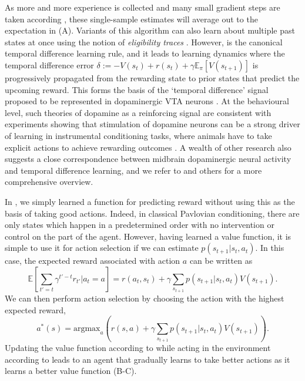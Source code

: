 As more and more experience is collected and many small gradient steps are taken according , these single-sample estimates will average out to the expectation in  (A).
Variants of this algorithm can also learn about multiple past states at once using the notion of \emph{eligibility traces} \citep{sutton2018reinforcement}.
However,  is the canonical temporal difference learning rule, and it leads to learning dynamics where the temporal difference error $\delta := - V(s_t) + r(s_t) + \gamma \mathbb{E}_\pi \left [ V(s_{t+1}) \right ]$ is progressively propagated from the rewarding state to prior states that predict the upcoming reward.
This forms the basis of the `temporal difference' signal proposed to be represented in dopaminergic VTA neurons \citep{schultz1997neural}.
At the behavioural level, such theories of dopamine as a reinforcing signal are consistent with experiments showing that stimulation of dopamine neurons can be a strong driver of learning in instrumental conditioning tasks, where animals have to take explicit actions to achieve rewarding outcomes \citep{olds1954positive, tsai2009phasic}.
A wealth of other research also suggests a close correspondence between midbrain dopaminergic neural activity and temporal difference learning, and we refer to \citet{niv2009reinforcement} and others for a more comprehensive overview.



In , we simply learned a function for predicting reward without using this as the basis of taking good actions.
Indeed, in classical Pavlovian conditioning, there are only states which happen in a predetermined order with no intervention or control on the part of the agent.
However, having learned a value function, it is simple to use it for action selection if we can estimate $p(s_{t+1} | s_t, a_t)$.
In this case, the expected reward associated with action $a$ can be written as
\begin{equation}
    \mathbb{E} \left [\sum_{t' = t} \gamma^{t'-t} r_{t'} | a_t = a \right ] = r(a_t, s_t) + \gamma \sum_{s_{t+1}} p(s_{t+1} | s_t, a_t) V(s_{t+1}).
\end{equation}
We can then perform action selection by choosing the action with the highest expected reward,
\begin{equation}
    \label{eq:value_action_selection}
    a^*(s) = \text{argmax}_{a} \left ( r(s, a) + \gamma \sum_{s_{t+1}} p(s_{t+1} | s_t, a_t) V(s_{t+1}) \right ).
\end{equation}
Updating the value function according to  while acting in the environment according to  leads to an agent that gradually learns to take better actions as it learns a better value function (B-C).

